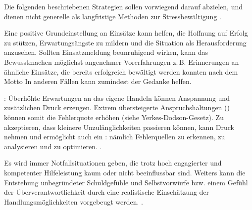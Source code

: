 Die folgenden beschriebenen Strategien sollen  vorwiegend
darauf abzielen,  und dienen nicht generelle als langfristige Methoden zur
Stressbewältigung \cite{Karutz200912}.


{Eine positive Grundeinstellung an Einsätze
kann helfen, die Hoffnung auf Erfolg zu stützen,
Erwartungsängste zu mildern und die Situation als
Herausforderung anzusehen. Sollten Einsatzmeldung
beunruhigend wirken, kann das Bewusstmachen möglichst angenehmer
Vorerfahrungen z.\,B. Erinnerungen an ähnliche Einsätze, die
bereits erfolgreich bewältigt werden konnten nach dem Motto
 In anderen Fällen
kann zumindest der Gedanke  helfen.

: Überhöhte Erwartungen
an das eigene Handeln können Anspannung und zusätzlichen
Druck erzeugen. Extrem übersteigerte Anspruchshaltungen
() können
somit die Fehlerquote erhöhen (siehe Yerkes-Dodson-Gesetz). Zu
akzeptieren, dass kleinere Unzulänglichkeiten passieren
können, kann Druck nehmen und ermöglicht auch ein
: nämlich Fehlerquellen zu erkennen,
zu analysieren und zu optimieren. .

Es wird immer Notfallsituationen geben, die trotz hoch engagierter und
kompetenter Hilfeleistung kaum oder nicht beeinflussbar
sind. Weiters kann die Entstehung unbegründeter
Schuldgefühle und Selbstvorwürfe bzw. einem Gefühl der
Überverantwortlichkeit durch eine realistische Einschätzung
der Handlungsmöglichkeiten vorgebeugt werden.
.}
{}
{}
{}
{}

